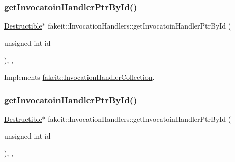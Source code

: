 \mbox{\label{classfakeit_1_1InvocationHandlers_a47af368f009fc5e3cce950ebbab4c48d}} 
\subsubsection{\texorpdfstring{getInvocatoinHandlerPtrById()}{getInvocatoinHandlerPtrById()}\hspace{0.1cm}{\footnotesize\ttfamily [2/9]}}
{\footnotesize\ttfamily \mbox{\hyperlink{classfakeit_1_1Destructible}{Destructible}}$\ast$ fakeit\+::\+Invocation\+Handlers\+::get\+Invocatoin\+Handler\+Ptr\+By\+Id (\begin{DoxyParamCaption}\item[{unsigned int}]{id }\end{DoxyParamCaption})\hspace{0.3cm}{\ttfamily [inline]}, {\ttfamily [override]}, {\ttfamily [virtual]}}



Implements \mbox{\hyperlink{structfakeit_1_1InvocationHandlerCollection_aa0bb622369d838f8c4daa93a8b992b57}{fakeit\+::\+Invocation\+Handler\+Collection}}.

\mbox{\label{classfakeit_1_1InvocationHandlers_a47af368f009fc5e3cce950ebbab4c48d}} 
\subsubsection{\texorpdfstring{getInvocatoinHandlerPtrById()}{getInvocatoinHandlerPtrById()}\hspace{0.1cm}{\footnotesize\ttfamily [3/9]}}
{\footnotesize\ttfamily \mbox{\hyperlink{classfakeit_1_1Destructible}{Destructible}}$\ast$ fakeit\+::\+Invocation\+Handlers\+::get\+Invocatoin\+Handler\+Ptr\+By\+Id (\begin{DoxyParamCaption}\item[{unsigned int}]{id }\end{DoxyParamCaption})\hspace{0.3cm}{\ttfamily [inline]}, {\ttfamily [override]}, {\ttfamily [virtual]}}



